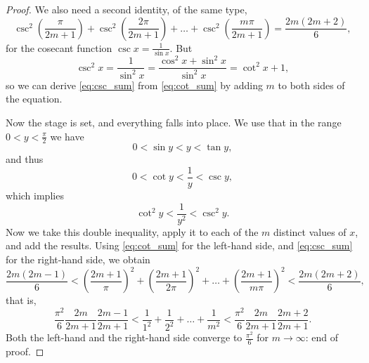 \begin{proof}
  We also need a second identity, of the same type,
  \begin{equation} \label{eq:csc_sum}
  \csc^2 \left(\frac{\pi}{2m+1}\right) + \csc^2 \left(\frac{2\pi}{2m+1}\right) + \dots + \csc^2 \left(\frac{m\pi}{2m+1}\right) = \frac{2m(2m+2)}{6},
  \end{equation}
  for the cosecant function $\csc x = \frac{1}{\sin x}$.
  But
  \[
  \csc^2 x = \frac{1}{\sin^2 x} = \frac{\cos^2 x + \sin^2 x}{\sin^2 x} = \cot^2 x + 1,
  \]
  so we can derive \eqref{eq:csc_sum} from \eqref{eq:cot_sum} by adding $m$ to both sides of the equation.
  
  Now the stage is set, and everything falls into place.
  We use that in the range $0 < y < \frac{\pi}{2}$ we have
  \[
  0 < \sin y < y < \tan y,
  \]
  and thus
  \[
  0 < \cot y < \frac{1}{y} < \csc y,
  \]
  which implies
  \[
  \cot^2 y < \frac{1}{y^2} < \csc^2 y.
  \]
  Now we take this double inequality, apply it to each of the $m$ distinct values of $x$, and add the results.
  Using \eqref{eq:cot_sum} for the left-hand side, and \eqref{eq:csc_sum} for the right-hand side, we obtain
  \[
  \frac{2m(2m-1)}{6} < \left(\frac{2m+1}{\pi}\right)^2 + \left(\frac{2m+1}{2\pi}\right)^2 + \dots + \left(\frac{2m+1}{m\pi}\right)^2 < \frac{2m(2m+2)}{6},
  \]
  that is,
  \[
  \frac{\pi^2}{6} \frac{2m}{2m+1} \frac{2m-1}{2m+1} < \frac{1}{1^2} + \frac{1}{2^2} + \dots + \frac{1}{m^2} < \frac{\pi^2}{6} \frac{2m}{2m+1} \frac{2m+2}{2m+1}.
  \]
  Both the left-hand and the right-hand side converge to $\frac{\pi^2}{6}$ for $m \to \infty$: end of proof.
\end{proof}


